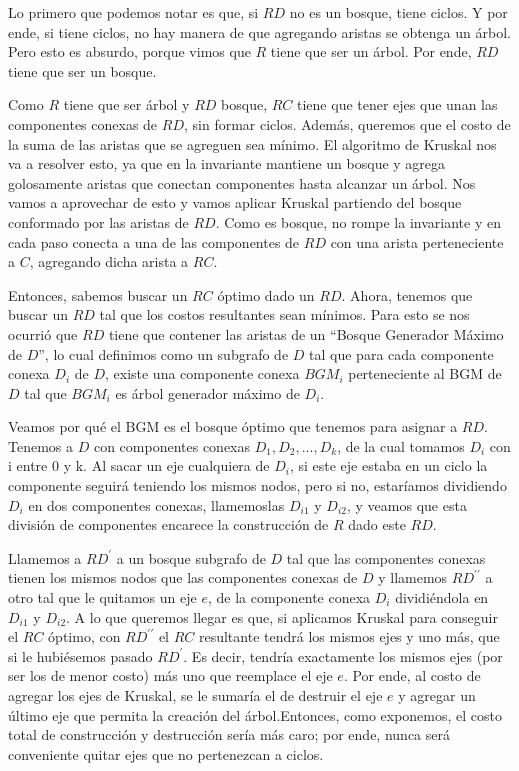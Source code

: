 Lo primero que podemos notar es que, si $RD$ no es un bosque, tiene ciclos. Y por ende, si tiene ciclos, no hay manera de que agregando aristas se obtenga un árbol. Pero esto es absurdo, porque vimos que $R$ tiene que ser un árbol. Por ende, $RD$ tiene que ser un bosque. %

Como $R$ tiene que ser árbol y $RD$ bosque, $RC$ tiene que tener ejes que unan las componentes conexas de $RD$, sin formar ciclos. Además, queremos que el costo de la suma de las aristas que se agreguen sea mínimo. El algoritmo de Kruskal nos va a resolver esto, ya que en la invariante mantiene un bosque y agrega golosamente aristas que conectan componentes hasta alcanzar un árbol. Nos vamos a aprovechar de esto y vamos aplicar Kruskal partiendo del bosque conformado por las aristas de $RD$. Como es bosque, no rompe la invariante y en cada paso conecta a una de las componentes de $RD$ con una arista perteneciente a $C$, agregando dicha arista a $RC$. %

Entonces, sabemos buscar un $RC$ óptimo dado un $RD$. Ahora, tenemos que buscar un $RD$ tal que los costos resultantes sean mínimos. Para esto se nos ocurrió que $RD$ tiene que contener las aristas de un “Bosque Generador Máximo de $D$”, lo cual definimos como un subgrafo de $D$ tal que para cada componente conexa $D_i$ de $D$, existe una componente conexa $BGM_i$ perteneciente al BGM de $D$ tal que $BGM_i$ es árbol generador máximo de $D_i$.

Veamos por qué el BGM es el bosque óptimo que tenemos para asignar a $RD$. Tenemos a $D$ con componentes conexas $D_1 , D_2 , ... , D_k$, de la cual tomamos $D_i$ con i entre 0 y k. Al sacar un eje cualquiera de $D_i$, si este eje estaba en un ciclo la componente seguirá teniendo los mismos nodos, pero si no, estaríamos dividiendo $D_i$ en dos componentes conexas, llamemoslas $D_{i1}$ y $D_{i2}$, y veamos que esta división de componentes encarece la construcción de $R$ dado este $RD$. 

Llamemos a $RD^{\prime}$ a un bosque subgrafo de $D$ tal que las componentes conexas tienen los mismos nodos que las componentes conexas de $D$ y llamemos $RD^{\prime\prime}$ a otro tal que le quitamos un eje $e$, de la componente conexa $D_i$ dividiéndola en $D_{i1}$ y $D_{i2}$. A lo que queremos llegar es que, si aplicamos Kruskal para conseguir el $RC$ óptimo, con $RD^{\prime\prime}$ el $RC$ resultante tendrá los mismos ejes y uno más, que si le hubiésemos pasado $RD^{\prime}$. Es decir, tendría exactamente los mismos ejes (por ser los de menor costo) más uno que reemplace el eje $e$. Por ende, al costo de agregar los ejes de Kruskal, se le sumaría el de destruir el eje $e$ y agregar un último eje que permita la creación del árbol.Entonces, como exponemos, el costo total de construcción y destrucción sería más caro; por ende, nunca será conveniente quitar ejes que no pertenezcan a ciclos.

